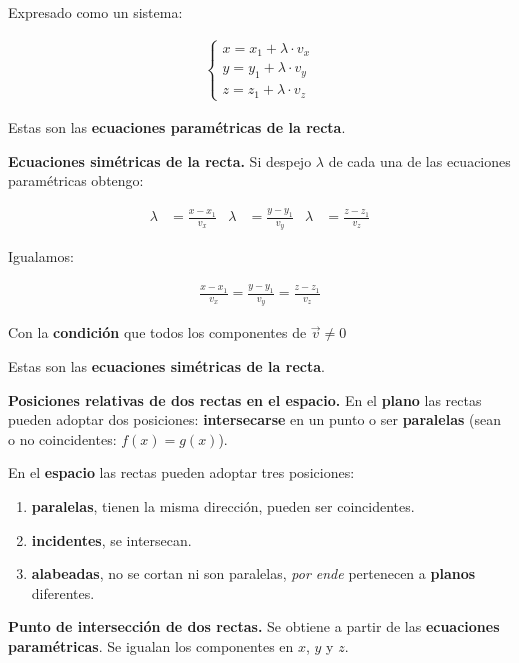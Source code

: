 \documentclass{article}
\begin{document}
Expresado como un sistema:

\begin{align*}
    \begin{cases}
        x = x_1 + \lambda \cdot v_x \\
        y = y_1 + \lambda \cdot v_y \\
        z = z_1 + \lambda \cdot v_z
    \end{cases}
\end{align*}

Estas son las \textbf{ecuaciones paramétricas de la recta}.

\textbf{Ecuaciones simétricas de la recta.} Si despejo \(\lambda\) de cada una
de las ecuaciones paramétricas obtengo:

\begin{align*}
    \lambda & = \frac{x - x_1}{v_x} & \lambda & = \frac{y - y_1}{v_y} & \lambda & = \frac{z - z_1}{v_z}
\end{align*}

Igualamos:

\begin{align*}
    \frac{x - x_1}{v_x} = \frac{y - y_1}{v_y} = \frac{z - z_1}{v_z}
\end{align*}

Con la \textbf{condición} que todos los componentes de \(\vec{v} \neq 0\)

Estas son las \textbf{ecuaciones simétricas de la recta}.

\textbf{Posiciones relativas de dos rectas en el espacio.} En el \textbf{plano}
las rectas pueden adoptar dos posiciones: \textbf{intersecarse} en un punto o
ser \textbf{paralelas} (sean o no coincidentes: \(f(x) = g(x)\)).

En el \textbf{espacio} las rectas pueden adoptar tres posiciones:

\begin{enumerate}
    \item \textbf{paralelas}, tienen la misma dirección, pueden ser
          coincidentes.
    \item \textbf{incidentes}, se intersecan.
    \item \textbf{alabeadas}, no se cortan ni son paralelas, \textit{por ende}
          pertenecen a \textbf{planos} diferentes.
\end{enumerate}

\textbf{Punto de intersección de dos rectas.} Se obtiene a partir de las 
\textbf{ecuaciones paramétricas}.  Se igualan los componentes en $x$, $y$ y $z$.
\end{document}
